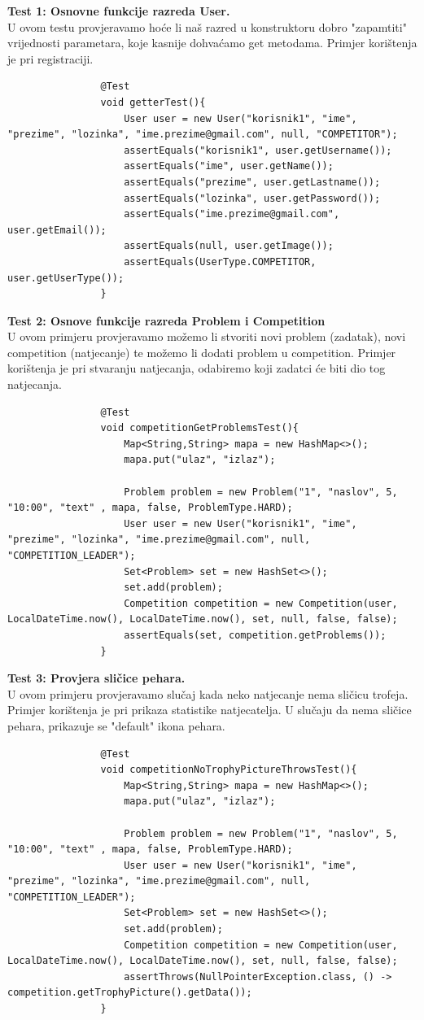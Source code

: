 						\textbf{Test 1: Osnovne funkcije razreda User.}\\
			U ovom testu provjeravamo hoće li naš razred u konstruktoru dobro "zapamtiti" vrijednosti parametara, koje kasnije dohvaćamo get metodama. Primjer korištenja je pri registraciji.
			\begin{lstlisting}
				@Test
				void getterTest(){
					User user = new User("korisnik1", "ime", "prezime", "lozinka", "ime.prezime@gmail.com", null, "COMPETITOR");
					assertEquals("korisnik1", user.getUsername());
					assertEquals("ime", user.getName());
					assertEquals("prezime", user.getLastname());
					assertEquals("lozinka", user.getPassword());
					assertEquals("ime.prezime@gmail.com", user.getEmail());
					assertEquals(null, user.getImage());
					assertEquals(UserType.COMPETITOR, user.getUserType());	
				}
			\end{lstlisting}
			
			\textbf{Test 2: Osnove funkcije razreda Problem i Competition}\\
			U ovom primjeru provjeravamo možemo li stvoriti novi problem (zadatak), novi competition (natjecanje) te možemo li dodati problem u competition. Primjer korištenja je pri stvaranju natjecanja, odabiremo koji zadatci će biti dio tog natjecanja.
			\begin{lstlisting}
				@Test
				void competitionGetProblemsTest(){
					Map<String,String> mapa = new HashMap<>();
					mapa.put("ulaz", "izlaz");
					
					Problem problem = new Problem("1", "naslov", 5, "10:00", "text" , mapa, false, ProblemType.HARD);
					User user = new User("korisnik1", "ime", "prezime", "lozinka", "ime.prezime@gmail.com", null, "COMPETITION_LEADER");
					Set<Problem> set = new HashSet<>();
					set.add(problem);
					Competition competition = new Competition(user, LocalDateTime.now(), LocalDateTime.now(), set, null, false, false);
					assertEquals(set, competition.getProblems());
				}
			\end{lstlisting}
			
			\textbf{Test 3: Provjera sličice pehara.}\\
			U ovom primjeru provjeravamo slučaj kada neko natjecanje nema sličicu trofeja. Primjer korištenja je pri prikaza statistike natjecatelja. U slučaju da nema sličice pehara, prikazuje se "default" ikona pehara.
			\begin{lstlisting}
				@Test
				void competitionNoTrophyPictureThrowsTest(){
					Map<String,String> mapa = new HashMap<>();
					mapa.put("ulaz", "izlaz");
					
					Problem problem = new Problem("1", "naslov", 5, "10:00", "text" , mapa, false, ProblemType.HARD);
					User user = new User("korisnik1", "ime", "prezime", "lozinka", "ime.prezime@gmail.com", null, "COMPETITION_LEADER");
					Set<Problem> set = new HashSet<>();
					set.add(problem);
					Competition competition = new Competition(user, LocalDateTime.now(), LocalDateTime.now(), set, null, false, false);
					assertThrows(NullPointerException.class, () ->  competition.getTrophyPicture().getData());
				}
			\end{lstlisting}
			
